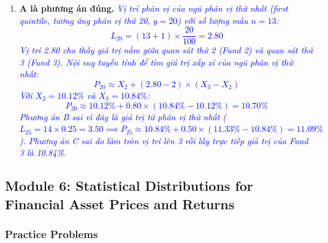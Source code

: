 \begin{enumerate}
	\item \textbf{A là phương án đúng.} \textcolor{blue}{\textit{Vị trí phân vị của ngũ phân vị thứ nhất (first quintile, tương ứng phân vị thứ 20, $y = 20$) với số lượng mẫu $n=13$:
	      \[
	      L_{20} = (13 + 1) \times \frac{20}{100} = 2.80
	      \]
	      Vị trí 2.80 cho thấy giá trị nằm giữa quan sát thứ 2 (Fund 2) và quan sát thứ 3 (Fund 3).
	      Nội suy tuyến tính để tìm giá trị xấp xỉ của ngũ phân vị thứ nhất:
	      \[
	      P_{20} \approx X_2 + (2.80 - 2) \times (X_3 - X_2)
	      \]
	      Với $X_2 = 10.12\%$ và $X_3 = 10.84\%$:
	      \[
	      P_{20} \approx 10.12\% + 0.80 \times (10.84\% - 10.12\%) = 10.70\%
	      \]
	      Phương án B sai vì đây là giá trị tứ phân vị thứ nhất ($L_{25} = 14 \times 0.25 = 3.50 \implies P_{25} \approx 10.84\% + 0.50 \times (11.33\% - 10.84\%) = 11.09\%$). Phương án C sai do làm tròn vị trí lên 3 rồi lấy trực tiếp giá trị của Fund 3 là 10.84\%.}}
\end{enumerate}

\newpage

\subsection{Module 6: Statistical Distributions for Financial Asset Prices and Returns}
\label{sec:app_Problems_M6}

\subsubsection{Practice Problems}
\label{subsec:app_Problems_M6}

